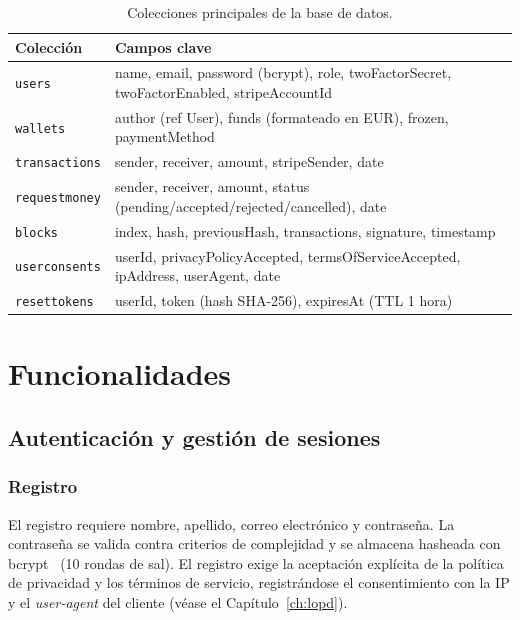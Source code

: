 \begin{table}[H]
\centering
\caption{Colecciones principales de la base de datos.}\label{tab:colecciones}
\begin{tabularx}{\textwidth}{lX}
\toprule
\textbf{Colección} & \textbf{Campos clave} \\
\midrule
\texttt{users}         & name, email, password (bcrypt), role, twoFactorSecret, twoFactorEnabled, stripeAccountId \\
\texttt{wallets}       & author (ref User), funds (formateado en EUR), frozen, paymentMethod \\
\texttt{transactions}  & sender, receiver, amount, stripeSender, date \\
\texttt{requestmoney}  & sender, receiver, amount, status (pending/accepted/rejected/cancelled), date \\
\texttt{blocks}        & index, hash, previousHash, transactions, signature, timestamp \\
\texttt{userconsents}  & userId, privacyPolicyAccepted, termsOfServiceAccepted, ipAddress, userAgent, date \\
\texttt{resettokens}   & userId, token (hash SHA-256), expiresAt (TTL 1 hora) \\
\bottomrule
\end{tabularx}
\end{table}

\chapter{Funcionalidades}\label{ch:funcionalidades}

\section{Autenticación y gestión de sesiones}

\subsection{Registro}
El registro requiere nombre, apellido, correo electrónico y contraseña. La contraseña se valida contra criterios de complejidad y se almacena hasheada con bcrypt~\cite{bcrypt} (10 rondas de sal). El registro exige la aceptación explícita de la política de privacidad y los términos de servicio, registrándose el consentimiento con la IP y el \emph{user-agent} del cliente (véase el Capítulo~\ref{ch:lopd}).

